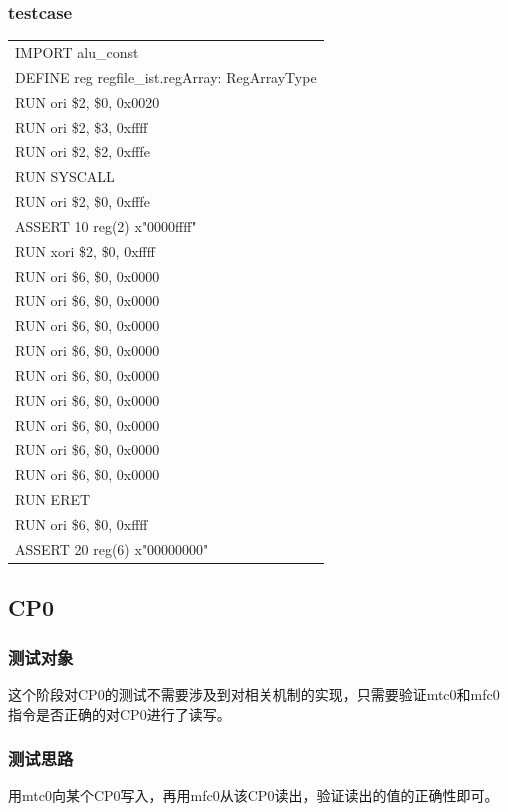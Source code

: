 \documentclass[11pt,utf8]{article}
\begin{document}
{{{\subsubsection{testcase} {
\begin{center}	\begin{longtable}{p{15cm}} \hline
		IMPORT{ }alu\_const\\
		DEFINE{ }reg{ }regfile\_ist.regArray:{ }RegArrayType\\
		RUN{ }ori{ }\$2,{ }\$0,{ }0x0020\\
		RUN{ }ori{ }\$2,{ }\$3,{ }0xffff\\
		RUN{ }ori{ }\$2,{ }\$2,{ }0xfffe\\
		RUN{ }SYSCALL\\
		RUN{ }ori{ }\$2,{ }\$0,{ }0xfffe\\
		ASSERT{ }10{ }reg(2){ }x"0000ffff"\\
		RUN{ }xori{ }\$2,{ }\$0,{ }0xffff\\
		RUN{ }ori{ }\$6,{ }\$0,{ }0x0000\\
		RUN{ }ori{ }\$6,{ }\$0,{ }0x0000\\
		RUN{ }ori{ }\$6,{ }\$0,{ }0x0000\\
		RUN{ }ori{ }\$6,{ }\$0,{ }0x0000\\
		RUN{ }ori{ }\$6,{ }\$0,{ }0x0000\\
		RUN{ }ori{ }\$6,{ }\$0,{ }0x0000\\
		RUN{ }ori{ }\$6,{ }\$0,{ }0x0000\\
		RUN{ }ori{ }\$6,{ }\$0,{ }0x0000\\
		RUN{ }ori{ }\$6,{ }\$0,{ }0x0000\\
		RUN{ }ERET\\
		RUN{ }ori{ }\$6,{ }\$0,{ }0xffff\\
		ASSERT{ }20{ }reg(6){ }x"00000000"\\
		\hline \end{longtable} \end{center}
}
}

\subsection{CP0} {
\subsubsection{测试对象} {
这个阶段对CP0的测试不需要涉及到对相关机制的实现，只需要验证mtc0和mfc0指令是否正确的对CP0进行了读写。
}
\subsubsection{测试思路} {
用mtc0向某个CP0写入，再用mfc0从该CP0读出，验证读出的值的正确性即可。
}
}}}
\end{document}
